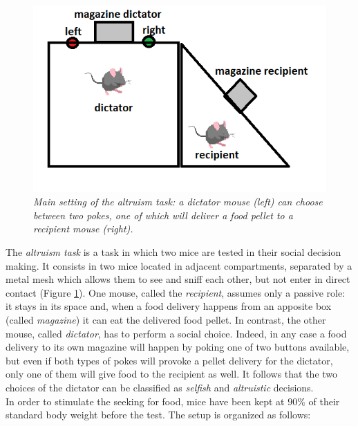 \documentclass[12pt, a4paper]{report}
\begin{document}
\begin{figure}[H]
	\begin{center}
		\includegraphics[scale=0.55]{altruism.png} 
	\end{center} 
	\caption{\textit{Main setting of the altruism task: a dictator mouse (left) can choose between two pokes, one of which will deliver a food pellet to a recipient mouse (right).}} \label{altruism}
	
\end{figure}

The \textit{altruism task} is a task in which two mice are tested in their social decision making. It consists in two mice located in adjacent compartments, separated by a metal mesh which allows them to see and sniff each other, but not enter in direct contact (Figure \ref{altruism}). One mouse, called the \textit{recipient}, assumes only a passive role: it stays in its space and, when a food delivery happens from an apposite box (called \textit{magazine}) it can eat the delivered food pellet. 
In contrast, the other mouse, called \textit{dictator}, has to perform a social choice. Indeed, in any case a food delivery to its own magazine will happen by poking one of two buttons available, but even if both types of pokes will provoke a pellet delivery for the dictator, only one of them will give food to the recipient as well. It follows that the two choices of the dictator can be classified as \textit{selfish} and \textit{altruistic} decisions.\\
In order to stimulate the seeking for food, mice have been kept at $ 90 \%$ of their standard body weight before the test. The setup is organized as follows:
\end{document}
